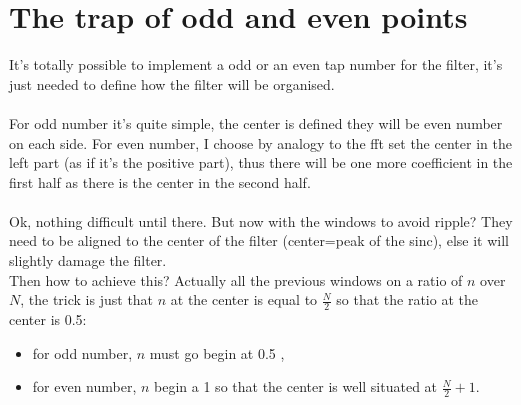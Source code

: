 \documentclass[twoside,twocolumn]{article}
\begin{document}
\section{The trap of odd and even points}
It's totally possible to implement a odd or an even tap number for the filter, it's just needed to define how the filter will be organised.\\ \\
For odd number it's quite simple, the center is defined they will be even number on each side.
For even number,  I choose by analogy to the fft set the center in the left part (as if it's the positive part), thus there will be one more coefficient in the first half as there is the center in the second half.\\ \\

Ok, nothing difficult until there. But now with the windows to avoid ripple? They need to be aligned to the center of the filter (center=peak of the sinc), else it will slightly damage the filter.\\
Then how to achieve this? Actually all the previous windows on a ratio of $n$ over $N$, the trick is just that $n$ at the center is equal to $\frac{N}{2}$ so that the ratio at the center is 0.5:
\begin{itemize}
	\item for odd number, $n$ must go begin at 0.5 ,
	\item for even number, $n$ begin a 1 so that the center is well situated at $\frac{N}{2}+1$.
\end{itemize}

%
% 



\end{document}
